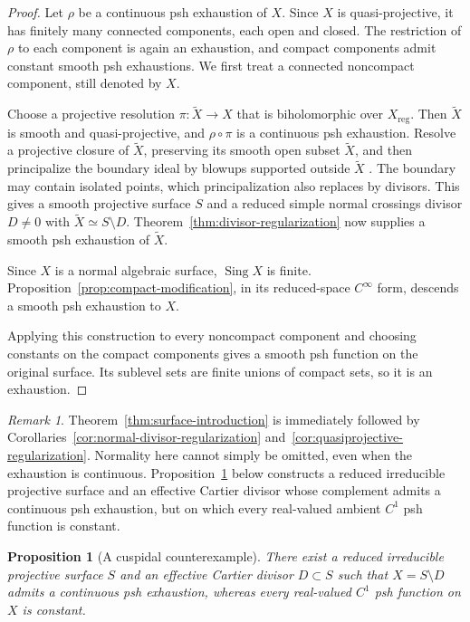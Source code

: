\documentclass[11pt]{amsart}
\newtheorem{proposition}[theorem]{Proposition}
\theoremstyle{definition}
\theoremstyle{remark}
\newtheorem{remark}{Remark}[section]
\numberwithin{equation}{section}
\begin{document}
\begin{proof}
Let $\rho$ be a continuous psh exhaustion of $X$.
Since $X$ is quasi-projective, it has finitely many connected
components, each open and closed. The restriction of $\rho$
to each component is again an exhaustion, and compact components
admit constant smooth psh exhaustions. We first treat a connected
noncompact component, still denoted by $X$.

Choose a projective resolution $\pi:\widetilde X\to X$ that is
biholomorphic over $X_{\mathrm{reg}}$. Then $\widetilde X$ is smooth
and quasi-projective, and $\rho\circ\pi$ is a continuous psh
exhaustion. Resolve a projective closure of $\widetilde X$,
preserving its smooth open subset $\widetilde X$, and then
principalize the boundary ideal by blowups supported outside
$\widetilde X$
\cite[Theorems~1.0.1 and~1.0.2]{Wlodarczyk05}.
The boundary may contain isolated points, which principalization
also replaces by divisors. This gives a smooth projective surface
$S$ and a reduced simple normal crossings divisor $D\ne0$ with
$\widetilde X\simeq S\setminus D$.
Theorem~\ref{thm:divisor-regularization} now supplies a smooth
psh exhaustion of $\widetilde X$.

Since $X$ is a normal algebraic surface, $\operatorname{Sing}X$
is finite. Proposition~\ref{prop:compact-modification}, in its
reduced-space $C^\infty$ form, descends a smooth psh exhaustion
to $X$.

Applying this construction to every noncompact component
and choosing constants on the compact components gives
a smooth psh function on the original surface.
Its sublevel sets are finite unions of compact sets,
so it is an exhaustion.
\end{proof}

\begin{remark}
\label{rem:surface-without-continuity}
Theorem~\ref{thm:surface-introduction} is immediately followed by Corollaries~\ref{cor:normal-divisor-regularization}
and~\ref{cor:quasiprojective-regularization}.
Normality here cannot simply be omitted, even when the exhaustion
is continuous. Proposition~\ref{prop:cuspidal-counterexample}
below constructs a reduced irreducible projective surface
and an effective Cartier divisor whose complement admits a
continuous psh exhaustion, but on which every real-valued
ambient $C^1$ psh function is constant.
\end{remark}

\begin{proposition}[A cuspidal counterexample]
\label{prop:cuspidal-counterexample}
There exist a reduced irreducible projective surface $S$ and an
effective Cartier divisor $D\subset S$ such that
$X=S\setminus D$ admits a continuous psh exhaustion, whereas every
real-valued $C^1$ psh function on $X$ is constant.
\end{proposition}
\end{document}
